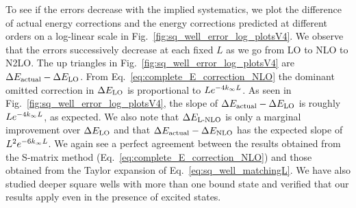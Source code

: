	To see if the errors decrease with the implied systematics, we plot
	the difference of actual energy corrections and the energy corrections
	predicted at different orders on a log-linear scale in
	Fig.~\ref{fig:sq_well_error_log_plotsV4}.  We observe that the errors
	successively decrease at each fixed $L$ as we go from LO to NLO to
	N2LO.  The up triangles in Fig.~\ref{fig:sq_well_error_log_plotsV4} are
	$\Delta E_{\rm actual} - \Delta E_{\rm LO}$.  From
	Eq.~\eqref{eq:complete_E_correction_NLO} the dominant omitted
	correction in $\Delta E_{\rm LO}$ is proportional to $L e^{-4 k_{\infty} L}$.
	As seen in Fig.~\ref{fig:sq_well_error_log_plotsV4}, the slope
	of $\Delta E_{\rm actual} - \Delta E_{\rm LO}$ is roughly $L
	e^{-4 k_{\infty} L}$, as expected.  We also note that $\Delta E_{\rm \text{L-NLO}}$
	is only a marginal improvement over $\Delta E_{\rm LO}$ and that
	$\Delta E_{\rm actual} - \Delta E_{\rm NLO}$ has the expected slope of
	$L^2 e^{-6 k_{\infty} L}$.  We again see a perfect agreement between the
	results obtained from the S-matrix method
	(Eq.~\eqref{eq:complete_E_correction_NLO}) and those obtained from the
	Taylor expansion of Eq.~\eqref{eq:sq_well_matchingL}.  We have also
	studied deeper square wells with more than one bound state
	and verified that our results apply even in the presence of excited
	states.

